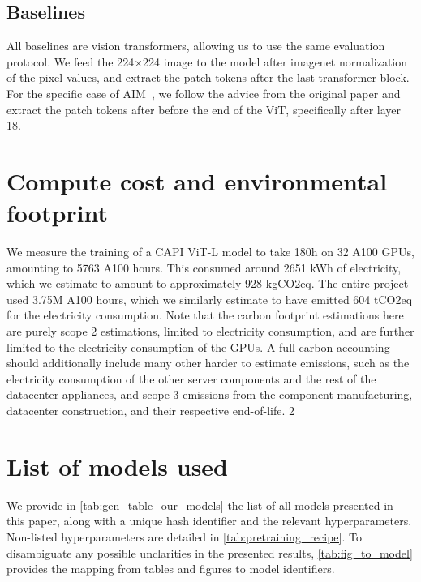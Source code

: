 \subsection{Baselines}
All baselines are vision transformers, allowing us to use the same evaluation protocol.
We feed the 224$\times{}$224 image to the model after imagenet normalization of the pixel values, and extract the patch tokens after the last transformer block.
For the specific case of AIM~\citep{aim}, we follow the advice from the original paper and extract the patch tokens after before the end of the ViT, specifically after layer 18.


\section{Compute cost and environmental footprint}
We measure the training of a CAPI ViT-L model to take 180h on 32 A100 GPUs, amounting to 5763 A100 hours.
This consumed around 2651 kWh of electricity, which we estimate to amount to approximately 928 kgCO2eq.
The entire project used 3.75M A100 hours, which we similarly estimate to have emitted 604 tCO2eq for the electricity consumption.
Note that the carbon footprint estimations here are purely scope 2 estimations, \ie limited to electricity consumption, and are further limited to the electricity consumption of the GPUs.
A full carbon accounting should additionally include many other harder to estimate emissions, such as the electricity consumption of the other server components and the rest of the datacenter appliances, and scope 3 emissions from the component manufacturing, datacenter construction, and their respective end-of-life.
2

\section{List of models used}
We provide in \autoref{tab:gen_table_our_models} the list of all models presented in this paper, along with a unique hash identifier and the relevant hyperparameters.
Non-listed hyperparameters are detailed in \autoref{tab:pretraining_recipe}.
To disambiguate any possible unclarities in the presented results, \autoref{tab:fig_to_model} provides the mapping from tables and figures to model identifiers.

